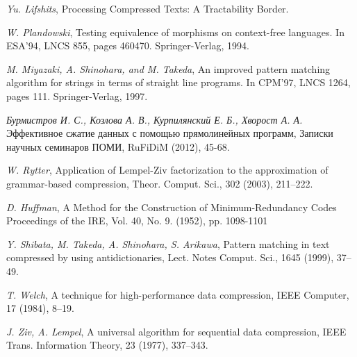 \documentclass[14pt]{article}
\begin{document}
\begin{thebibliography}{99}

\textsl{Yu. Lifshits}, Processing Compressed Texts: A Tractability Border.

\textsl{W. Plandowski}, Testing equivalence of morphisms on context-free languages. In
ESA'94, LNCS 855, pages 460470. Springer-Verlag, 1994.

\textsl{M. Miyazaki, A. Shinohara, and M. Takeda}, An improved pattern matching algorithm
for strings in terms of straight line programs. In CPM'97, LNCS 1264,
pages 111. Springer-Verlag, 1997.

\textsl{Бурмистров И. С., Козлова А. В., Курпилянский Е. Б., Хворост А. А.} Эффективное сжатие данных с помощью прямолинейных программ, Записки научных семинаров ПОМИ, RuFiDiM (2012), 45-68.

\textsl{W. Rytter}, Application of Lempel-Ziv factorization to the approximation of
grammar-based compression, Theor. Comput. Sci., 302 (2003), 211–222.

\textsl{D. Huffman},
A Method for the Construction of Minimum-Redundancy Codes Proceedings of the IRE, Vol. 40, No. 9. (1952), pp. 1098-1101 

\textsl{Y. Shibata, M. Takeda, A. Shinohara, S. Arikawa}, Pattern matching in text compressed by using antidictionaries, Lect. Notes Comput. Sci., 1645 (1999), 37–49.

\textsl{T. Welch}, A technique for high-performance data compression, IEEE Computer, 17 (1984), 8–19.

\textsl{J. Ziv, A. Lempel}, A universal algorithm for sequential data compression, IEEE Trans. Information Theory, 23 (1977), 337–343.

\end{thebibliography}
\end{document}
